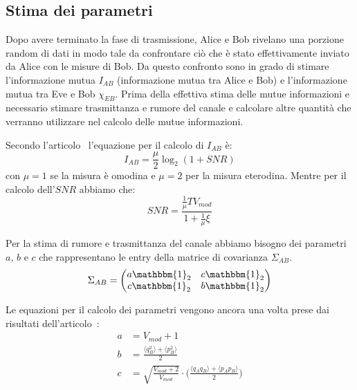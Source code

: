 \subsection{Stima dei parametri}\label{subse:stima-parametri}
Dopo avere terminato la fase di trasmissione, Alice e Bob rivelano una porzione random di dati in modo tale da confrontare ci\`o che \`e stato effettivamente inviato da Alice con le misure di Bob. Da questo confronto sono in grado di stimare l'informazione mutua $I_{AB}$ (informazione mutua tra Alice e Bob) e l'informazione mutua tra Eve e Bob $\chi_{EB}$. Prima della effettiva stima delle mutue informazioni e necessario stimare trasmittanza e rumore del canale e calcolare altre quantit\`a che verranno utilizzare nel calcolo delle mutue informazioni.

Secondo l'articolo~\cite{https://doi.org/10.1002/qute.201800011} l'equazione per il calcolo di $I_{AB}$ \`e:
\begin{equation} \label{eq:AB-info}
I_{AB} = \frac{\mu}{2}\log_2(1 + SNR)
\end{equation}
con $\mu = 1$ se la misura \`e omodina e $\mu = 2$ per la misura eterodina. Mentre per il calcolo dell'$SNR$ abbiamo che:
\begin{equation} \label{eq:snr}
SNR = \frac{\frac{1}{\mu} T V_{mod}}{1 + \frac{1}{\mu} \xi}
\end{equation}

Per la stima di rumore e trasmittanza del canale abbiamo bisogno dei parametri $a$, $b$ e $c$ che rappresentano le entry della matrice di covarianza $\Sigma_{AB}$.
\begin{equation}
\Sigma_{AB} =
\begin{pmatrix}
a \mathbbm{1}_2 & c \mathbbm{1}_2 \\
c \mathbbm{1}_2 & b \mathbbm{1}_2
\end{pmatrix}
\end{equation}

Le equazioni per il calcolo dei parametri vengono ancora una volta prese dai risultati dell'articolo~\cite{https://doi.org/10.1002/qute.201800011}:
\begin{equation}
\begin{split}
a& = V_{mod} + 1 \\
b& = \frac{\langle q_B^2 \rangle + \langle p_B^2 \rangle}{2} \\
c& = \sqrt{\frac{V_{mod} + 2}{V_{mod}}} \cdot \biggl ( \frac{\langle q_Aq_B \rangle + \langle p_Ap_B \rangle}{2}\biggr )
\end{split}
\end{equation}

